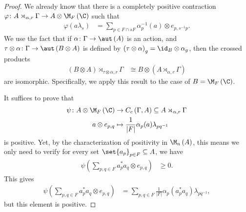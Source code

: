 \documentclass[10pt]{mypackage}
\begin{document}
\begin{proof}
  We already know that there is a completely positive contraction $\varphi\colon A\rtimes_{\alpha,r}\Gamma\rightarrow A\otimes \M_F\left( \C \right)$ such that
  \begin{align*}
    \varphi\left( a\lambda_s \right) &= \sum_{p\in F\cap sF} \alpha_p^{-1}\left( a \right)\otimes e_{p,s^{-1}p}.
  \end{align*}
  We use the fact that if $\alpha\colon \Gamma\rightarrow \aut\left( A \right)$ is an action, and $\tau\otimes \alpha\colon \Gamma\rightarrow \aut\left( B\otimes A \right)$ is defined by $\left( \tau\otimes\alpha \right)_g = \id_B\otimes \alpha_g$, then the crossed products
  \begin{align*}
    \left( B\otimes A \right)\rtimes_{\tau\otimes\alpha,r}\Gamma &\cong B\otimes \left( A\rtimes_{\alpha,r}\Gamma \right)
  \end{align*}
  are isomorphic. Specifically, we apply this result to the case of $B = \M_F\left( \C \right)$.

  It suffices to prove that
  \begin{align*}
    \psi\colon A\otimes \M_F\left( \C \right)&\rightarrow C_c\left( \Gamma,A \right)\subseteq A\rtimes_{\alpha,r}\Gamma\\
    a\otimes e_{p,q} &\mapsto \frac{1}{\left\vert F \right\vert} \alpha_p(a)\lambda_{pq^{-1}}
  \end{align*}
  is positive. Yet, by the characterization of positivity in $\M_n\left( A \right)$, this means we only need to verify for every set $\set{a_p}_{p\in F}\subseteq A$, we have
  \begin{align*}
    \psi\left( \sum_{p,q\in F} a_p^{\ast}a_q\otimes e_{p,q} \right) &\geq 0.
  \end{align*}
  This gives
  \begin{align*}
    \psi\left( \sum_{p,q\in F}a_p^{\ast}a_q \otimes e_{p,q} \right) &= \sum_{p,q\in F} \frac{1}{\left\vert F \right\vert} \alpha_p\left( a_p^{\ast}a_q \right)\lambda_{pq^{-1}},
  \end{align*}
  but this element is positive.
\end{proof}
\nocite{brown_and_ozawa,takesaki_1,goals_vna,ii1_factors_anantharaman_popa}
\printbibliography
\end{document}
